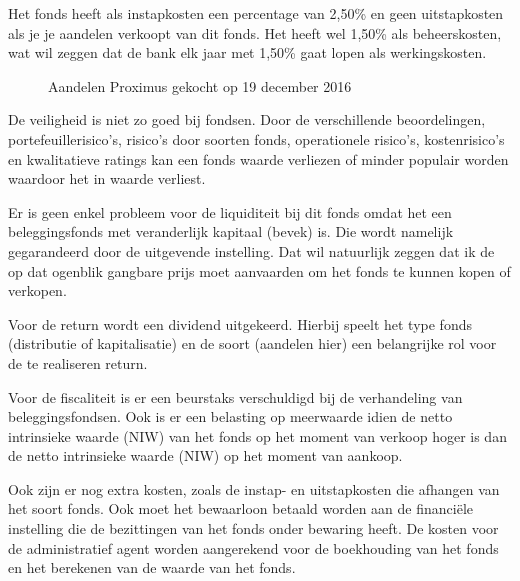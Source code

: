 Het fonds heeft als instapkosten een percentage van 2,50\% en geen uitstapkosten als je je aandelen verkoopt van dit fonds. Het heeft wel 1,50\% als beheerskosten, wat wil zeggen dat de bank elk jaar met 1,50\% gaat lopen als werkingskosten.


\begin{figure}[tbph!]
	\centering
	\caption[Aandelen Proximus]{Aandelen Proximus gekocht op 19 december 2016}
	\label{fig:overzichtsitetijdbefondsenenaandelen}
\end{figure}

De veiligheid is niet zo goed bij fondsen. Door de verschillende beoordelingen, portefeuillerisico's, risico's door soorten fonds, operationele risico's, kostenrisico's en kwalitatieve ratings kan een fonds waarde verliezen of minder populair worden waardoor het in waarde verliest.

Er is geen enkel probleem voor de liquiditeit bij dit fonds omdat het een beleggingsfonds met veranderlijk kapitaal (bevek) is. Die wordt namelijk gegarandeerd door de uitgevende instelling. Dat wil natuurlijk zeggen dat ik de op dat ogenblik gangbare prijs moet aanvaarden om het fonds te kunnen kopen of verkopen.

Voor de return wordt een dividend uitgekeerd. Hierbij speelt het type fonds (distributie of kapitalisatie) en de soort (aandelen hier) een belangrijke rol voor de te realiseren return.

Voor de fiscaliteit is er een beurstaks verschuldigd bij de verhandeling van beleggingsfondsen. Ook is er een belasting op meerwaarde idien de netto intrinsieke waarde (NIW) van het fonds op het moment van verkoop hoger is dan de netto intrinsieke waarde (NIW) op het moment van aankoop.

Ook zijn er nog extra kosten, zoals de instap- en uitstapkosten die afhangen van het soort fonds. Ook moet het bewaarloon betaald worden aan de financiële instelling die de bezittingen van het fonds onder bewaring heeft. De kosten voor de administratief agent worden aangerekend voor de boekhouding van het fonds en het berekenen van de waarde van het fonds.


